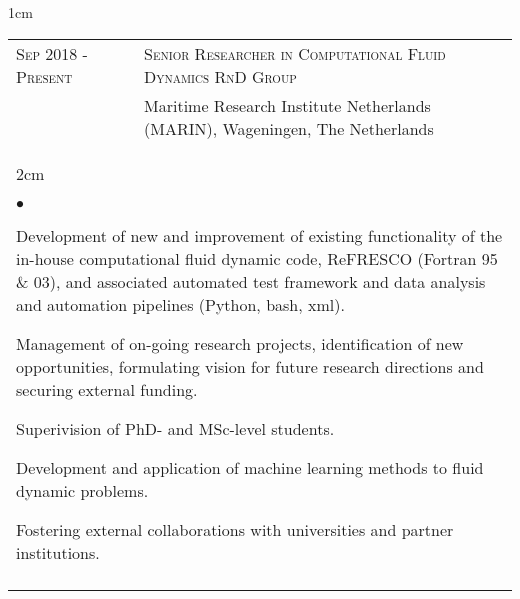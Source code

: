 \documentclass[a4paper,10pt]{article}
\newcommand{\squishlist}{
	\begin{list}{$\bullet$}
	{
		\setlength{\itemsep}{0pt}
		\setlength{\parsep}{0pt}
		\setlength{\topsep}{0pt}
		\setlength{\partopsep}{0pt}
		\setlength{\leftmargin}{2em}
		\setlength{\labelwidth}{1.5em}
		\setlength{\labelsep}{0.5em}
	}
}
\newcommand{\squishend}{\end{list}}
\begin{document}
\begin{minipage}{\textwidth}
\begin{adjustwidth}{}{1cm}

\begin{tabular}{p{3.5cm} p{12.9cm}}


\textsc{Sep 2018 - Present} & \textsc{Senior Researcher in Computational Fluid Dynamics RnD Group} \\
							& Maritime Research Institute Netherlands (MARIN), Wageningen, The Netherlands \vspace{0.1cm} \\
%
\multicolumn{2}{l}{
\hspace{1cm}\begin{minipage}[t]{\textwidth}
\begin{adjustwidth}{}{2cm}
\squishlist
	\item Development of new and improvement of existing functionality of the in-house
		computational fluid dynamic code, ReFRESCO (Fortran 95 \& 03), and associated automated test framework and data analysis and automation pipelines (Python, bash, xml).
	\item Management of on-going research projects, identification of new opportunities, formulating vision for future research directions and securing external funding.
	\item Superivision of PhD- and MSc-level students.
	\item Development and application of machine learning methods to fluid dynamic problems.
    \item Fostering external collaborations with universities and partner institutions.
\squishend
\end{adjustwidth}
\end{minipage}
} \\
\\


\end{tabular}
\end{adjustwidth}
\end{minipage}
\end{document}
